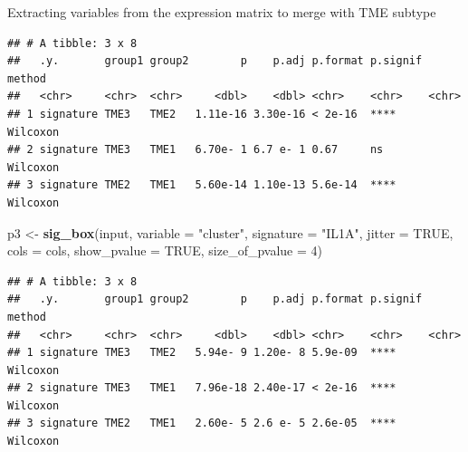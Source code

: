 \documentclass[
  12pt,
]{book}
\newenvironment{Shaded}{\begin{snugshade}}{\end{snugshade}}
\newcommand{\AttributeTok}[1]{\textcolor[rgb]{0.13,0.29,0.53}{#1}}
\newcommand{\ConstantTok}[1]{\textcolor[rgb]{0.56,0.35,0.01}{#1}}
\newcommand{\DecValTok}[1]{\textcolor[rgb]{0.00,0.00,0.81}{#1}}
\newcommand{\FunctionTok}[1]{\textcolor[rgb]{0.13,0.29,0.53}{\textbf{#1}}}
\newcommand{\NormalTok}[1]{#1}
\newcommand{\OtherTok}[1]{\textcolor[rgb]{0.56,0.35,0.01}{#1}}
\newcommand{\SpecialCharTok}[1]{\textcolor[rgb]{0.81,0.36,0.00}{\textbf{#1}}}
\newcommand{\StringTok}[1]{\textcolor[rgb]{0.31,0.60,0.02}{#1}}
\begin{document}
Extracting variables from the expression matrix to merge with TME subtype

\begin{Shaded}
\end{Shaded}

\begin{verbatim}
## # A tibble: 3 x 8
##   .y.       group1 group2        p    p.adj p.format p.signif method  
##   <chr>     <chr>  <chr>     <dbl>    <dbl> <chr>    <chr>    <chr>   
## 1 signature TME3   TME2   1.11e-16 3.30e-16 < 2e-16  ****     Wilcoxon
## 2 signature TME3   TME1   6.70e- 1 6.7 e- 1 0.67     ns       Wilcoxon
## 3 signature TME2   TME1   5.60e-14 1.10e-13 5.6e-14  ****     Wilcoxon
\end{verbatim}

\begin{Shaded}
\begin{Highlighting}[]
\NormalTok{p3 }\OtherTok{\textless{}{-}} \FunctionTok{sig\_box}\NormalTok{(input, }\AttributeTok{variable =} \StringTok{"cluster"}\NormalTok{, }\AttributeTok{signature =} \StringTok{"IL1A"}\NormalTok{, }
              \AttributeTok{jitter =} \ConstantTok{TRUE}\NormalTok{, }\AttributeTok{cols =}\NormalTok{  cols, }\AttributeTok{show\_pvalue =} \ConstantTok{TRUE}\NormalTok{, }\AttributeTok{size\_of\_pvalue =} \DecValTok{4}\NormalTok{)}
\end{Highlighting}
\end{Shaded}

\begin{verbatim}
## # A tibble: 3 x 8
##   .y.       group1 group2        p    p.adj p.format p.signif method  
##   <chr>     <chr>  <chr>     <dbl>    <dbl> <chr>    <chr>    <chr>   
## 1 signature TME3   TME2   5.94e- 9 1.20e- 8 5.9e-09  ****     Wilcoxon
## 2 signature TME3   TME1   7.96e-18 2.40e-17 < 2e-16  ****     Wilcoxon
## 3 signature TME2   TME1   2.60e- 5 2.6 e- 5 2.6e-05  ****     Wilcoxon
\end{verbatim}
\end{document}
